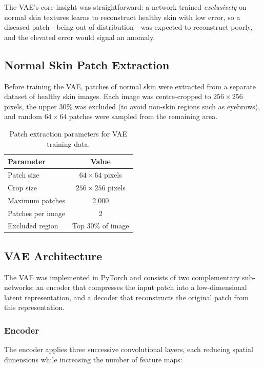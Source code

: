 The VAE's core insight was straightforward: a network trained \textit{exclusively}
on normal skin textures learns to reconstruct healthy skin with low error, so a
diseased patch---being out of distribution---was expected to reconstruct poorly,
and the elevated error would signal an anomaly.

\subsection{Normal Skin Patch Extraction}

Before training the VAE, patches of normal skin were extracted from a separate dataset of healthy skin images. Each image was centre-cropped to $256 \times 256$ pixels, the upper 30\% was excluded (to avoid non-skin regions such as eyebrows), and random $64 \times 64$ patches were sampled from the remaining area.

\begin{table}[H]
\centering
\caption{Patch extraction parameters for VAE training data.}
\label{tab:patch_params}
\begin{tabular}{|l|c|}
\hline
\textbf{Parameter} & \textbf{Value} \\ \hline
Patch size & $64 \times 64$ pixels \\ \hline
Crop size & $256 \times 256$ pixels \\ \hline
Maximum patches & 2{,}000 \\ \hline
Patches per image & 2 \\ \hline
Excluded region & Top 30\% of image \\ \hline
\end{tabular}
\end{table}

\subsection{VAE Architecture}

The VAE was implemented in PyTorch and consists of two complementary sub-networks: an encoder that compresses the input patch into a low-dimensional latent representation, and a decoder that reconstructs the original patch from this representation.

\subsubsection{Encoder}

The encoder applies three successive convolutional layers, each reducing spatial dimensions while increasing the number of feature maps:

